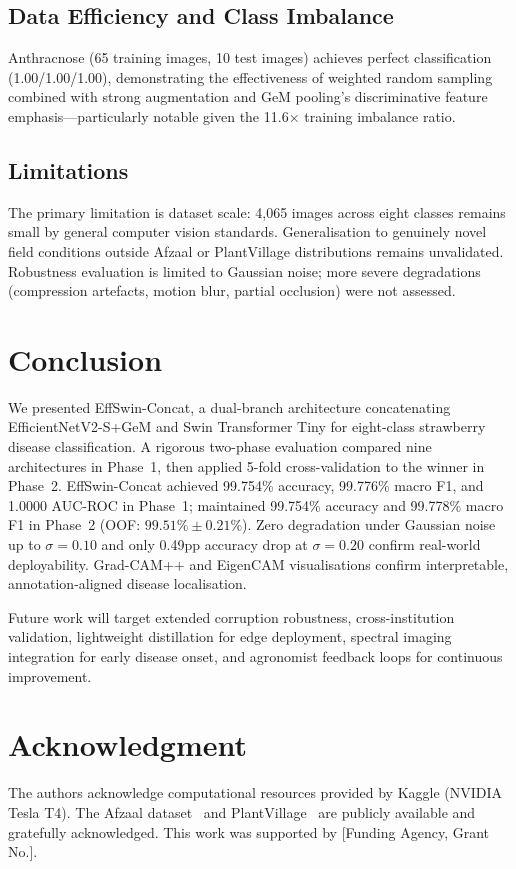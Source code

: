 \documentclass[conference]{IEEEtran}
\begin{document}
\subsection{Data Efficiency and Class Imbalance}
Anthracnose (65 training images, 10 test images) achieves perfect classification (1.00/1.00/1.00), demonstrating the effectiveness of weighted random sampling combined with strong augmentation and GeM pooling's discriminative feature emphasis---particularly notable given the 11.6$\times$ training imbalance ratio.

\subsection{Limitations}
The primary limitation is dataset scale: 4,065 images across eight classes remains small by general computer vision standards. Generalisation to genuinely novel field conditions outside Afzaal or PlantVillage distributions remains unvalidated. Robustness evaluation is limited to Gaussian noise; more severe degradations (compression artefacts, motion blur, partial occlusion) were not assessed.

\section{Conclusion}
\label{sec:conclusion}

We presented EffSwin-Concat, a dual-branch architecture concatenating EfficientNetV2-S+GeM and Swin Transformer Tiny for eight-class strawberry disease classification. A rigorous two-phase evaluation compared nine architectures in Phase~1, then applied 5-fold cross-validation to the winner in Phase~2. EffSwin-Concat achieved 99.754\% accuracy, 99.776\% macro F1, and 1.0000 AUC-ROC in Phase~1; maintained 99.754\% accuracy and 99.778\% macro F1 in Phase~2 (OOF: $99.51\%\pm0.21\%$). Zero degradation under Gaussian noise up to $\sigma{=}0.10$ and only 0.49pp accuracy drop at $\sigma{=}0.20$ confirm real-world deployability. Grad-CAM++ and EigenCAM visualisations confirm interpretable, annotation-aligned disease localisation.

Future work will target extended corruption robustness, cross-institution validation, lightweight distillation for edge deployment, spectral imaging integration for early disease onset, and agronomist feedback loops for continuous improvement.

\section*{Acknowledgment}
The authors acknowledge computational resources provided by Kaggle (NVIDIA Tesla T4). The Afzaal dataset~\cite{b6} and PlantVillage~\cite{b3} are publicly available and gratefully acknowledged. This work was supported by [Funding Agency, Grant No.].
\end{document}
